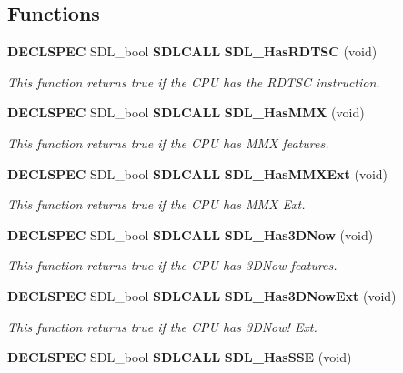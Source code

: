 \subsection*{Functions}
\begin{DoxyCompactItemize}
\item 
{\bf D\+E\+C\+L\+S\+P\+E\+C} S\+D\+L\+\_\+bool {\bf S\+D\+L\+C\+A\+L\+L} {\bf S\+D\+L\+\_\+\+Has\+R\+D\+T\+S\+C} (void)\label{_s_d_l__cpuinfo_8h_afea666a39b6be7821303adcf16e83c47}

\begin{DoxyCompactList}\small\item\em This function returns true if the C\+P\+U has the R\+D\+T\+S\+C instruction. \end{DoxyCompactList}\item 
{\bf D\+E\+C\+L\+S\+P\+E\+C} S\+D\+L\+\_\+bool {\bf S\+D\+L\+C\+A\+L\+L} {\bf S\+D\+L\+\_\+\+Has\+M\+M\+X} (void)\label{_s_d_l__cpuinfo_8h_aecec2f1434aa2eb5c82f974880f5181f}

\begin{DoxyCompactList}\small\item\em This function returns true if the C\+P\+U has M\+M\+X features. \end{DoxyCompactList}\item 
{\bf D\+E\+C\+L\+S\+P\+E\+C} S\+D\+L\+\_\+bool {\bf S\+D\+L\+C\+A\+L\+L} {\bf S\+D\+L\+\_\+\+Has\+M\+M\+X\+Ext} (void)
\begin{DoxyCompactList}\small\item\em This function returns true if the C\+P\+U has M\+M\+X Ext. \end{DoxyCompactList}\item 
{\bf D\+E\+C\+L\+S\+P\+E\+C} S\+D\+L\+\_\+bool {\bf S\+D\+L\+C\+A\+L\+L} {\bf S\+D\+L\+\_\+\+Has3\+D\+Now} (void)\label{_s_d_l__cpuinfo_8h_a57efd279a93553cf43a54e3a49db6305}

\begin{DoxyCompactList}\small\item\em This function returns true if the C\+P\+U has 3\+D\+Now features. \end{DoxyCompactList}\item 
{\bf D\+E\+C\+L\+S\+P\+E\+C} S\+D\+L\+\_\+bool {\bf S\+D\+L\+C\+A\+L\+L} {\bf S\+D\+L\+\_\+\+Has3\+D\+Now\+Ext} (void)
\begin{DoxyCompactList}\small\item\em This function returns true if the C\+P\+U has 3\+D\+Now! Ext. \end{DoxyCompactList}\item 
{\bf D\+E\+C\+L\+S\+P\+E\+C} S\+D\+L\+\_\+bool {\bf S\+D\+L\+C\+A\+L\+L} {\bf S\+D\+L\+\_\+\+Has\+S\+S\+E} (void)\label{_s_d_l__cpuinfo_8h_aed4b71a601e3a12786a5280f59c0e26d}


\end{DoxyCompactItemize}
